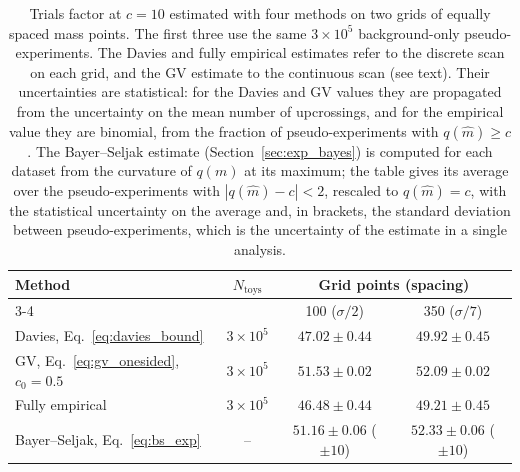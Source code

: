 
\begin{table}[htbp]
    \centering
    \caption{Trials factor at $c=10$ estimated with four methods on two grids of equally spaced mass points. The first three use the same $3\times10^5$ background-only pseudo-experiments. The Davies and fully empirical estimates refer to the discrete scan on each grid, and the GV estimate to the continuous scan (see text). Their uncertainties are statistical: for the Davies and GV values they are propagated from the uncertainty on the mean number of upcrossings, and for the empirical value they are binomial, from the fraction of pseudo-experiments with $q(\hat{m})\geq c$. The Bayer--Seljak estimate (Section~\ref{sec:exp_bayes}) is computed for each dataset from the curvature of $q(m)$ at its maximum; the table gives its average over the pseudo-experiments with $|q(\hat m)-c|<2$, rescaled to $q(\hat m)=c$, with the statistical uncertainty on the average and, in brackets, the standard deviation between pseudo-experiments, which is the uncertainty of the estimate in a single analysis.}
    \label{tab:trial_factors}
    \begin{tabular}{lccc}
        \toprule
        Method & $N_\text{toys}$ & \multicolumn{2}{c}{Grid points (spacing)} \\
        \cmidrule(lr){3-4}
         & & 100 ($\sigma/2$) & 350 ($\sigma/7$) \\
        \midrule
        Davies, Eq.~\eqref{eq:davies_bound} & $3\times10^5$ & $47.02 \pm 0.44$ & $49.92 \pm 0.45$ \\
        GV, Eq.~\eqref{eq:gv_onesided}, $c_0=0.5$ & $3\times10^5$ & $51.53 \pm 0.02$ & $52.09 \pm 0.02$ \\
        Fully empirical & $3\times10^5$ & $46.48 \pm 0.44$ & $49.21 \pm 0.45$ \\
        Bayer--Seljak, Eq.~\eqref{eq:bs_exp} & -- & $51.16 \pm 0.06$ ($\pm10$) & $52.33 \pm 0.06$ ($\pm10$) \\
        \bottomrule
    \end{tabular}
\end{table}


